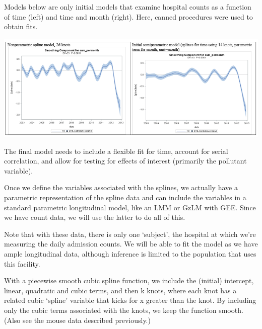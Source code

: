 \documentclass[
  9pt,
  ignorenonframetext,
]{beamer}
\begin{document}
\begin{frame}{}
\protect\hypertarget{section-12}{}
Models below are only initial models that examine hospital counts as a
function of time (left) and time and month (right). Here, canned
procedures were used to obtain fits.

\begin{center}\includegraphics[width=0.7\linewidth]{figs_L12/f16} \end{center}
\end{frame}

\begin{frame}{}
\protect\hypertarget{section-13}{}
The final model needs to include a flexible fit for time, account for
serial correlation, and allow for testing for effects of interest
(primarily the pollutant variable).

Once we define the variables associated with the splines, we actually
have a parametric representation of the spline data and can include the
variables in a standard parametric longitudinal model, like an LMM or
GzLM with GEE. Since we have count data, we will use the latter to do
all of this.

Note that with these data, there is only one `subject', the hospital at
which we're measuring the daily admission counts. We will be able to fit
the model as we have ample longitudinal data, although inference is
limited to the population that uses this facility.

With a piecewise smooth cubic spline function, we include the (initial)
intercept, linear, quadratic and cubic terms, and then k knots, where
each knot has a related cubic `spline' variable that kicks for x greater
than the knot. By including only the cubic terms associated with the
knots, we keep the function smooth. (Also see the mouse data described
previously.)
\end{frame}
\end{document}
